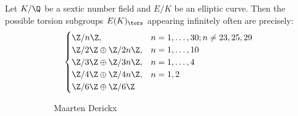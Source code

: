 \begin{frame}[plain]
\begin{thm}
Let $K/\Q$ be a sextic number field and $E/K$ be an elliptic curve. Then the possible torsion subgroups $E(K)_\tors$ appearing infinitely often are precisely:
	\[
	\begin{cases}
	\Z/n\Z, &  n=1,\ldots,30; n \neq 23,25,29 \\
	\Z/2\Z \oplus \Z/2n\Z, & n=1,\ldots,10 \\
	\Z/3\Z \oplus \Z/3n\Z, & n=1,\ldots,4 \\
	\Z/4\Z \oplus \Z/4n\Z, & n=1,2 \\
	\Z/6\Z \oplus \Z/6\Z 
	\end{cases}
	\]
\end{thm}
	\begin{figure}[h]
	\centering
	\begin{subfigure}{0.3\textwidth}
	\captionsetup{labelformat=empty}
	\centering
	\caption{\hspace{0.1cm}Maarten Derickx}
	\end{subfigure}
	\begin{subfigure}{0.3\textwidth}
	\captionsetup{labelformat=empty}
	\centering

\end{subfigure}
\end{figure}
\end{frame}
